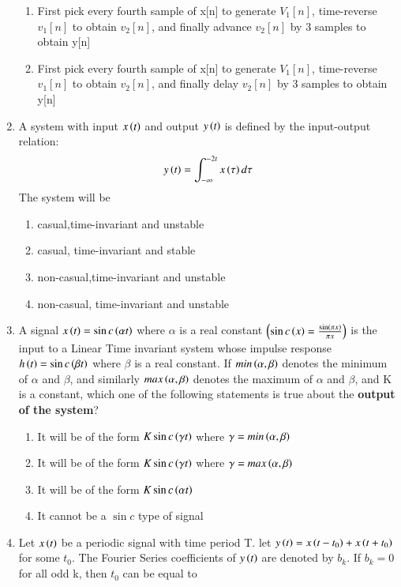 \documentclass[journal,12pt,onecolumn]{IEEEtran}
\theoremstyle{remark}
\begin{document}
\begin{enumerate}
\begin{enumerate}
          \item First pick every fourth sample of x[n] to generate $V_1[n]$, time-reverse $v_1[n]$ to obtain $v_2[n]$, and finally advance $v_2[n]$ by 3 samples to obtain y[n]
          \item  First pick every fourth sample of x[n] to generate $V_1[n]$, time-reverse $v_1[n]$ to obtain $v_2[n]$, and finally delay $v_2[n]$ by 3 samples to obtain y[n]
      \end{enumerate}
      \item A system with input $x\left(t\right)$ and output $y\left(t\right)$ is defined by the input-output relation:
      \begin{align}
          y\left(t\right)=\int_{-\infty}^{-2t}x\left(\tau\right)d\tau
      \end{align}
      The system will be 
      \begin{enumerate}
          \item casual,time-invariant and unstable
          \item casual, time-invariant and stable
          \item non-casual,time-invariant and unstable
          \item non-casual, time-invariant and unstable
      \end{enumerate}
      \item A signal $x\left(t\right)=\sin c\left(\alpha t\right)$ where $\alpha$ is a real constant $\left(\sin c\left(x\right)=\frac{\sin\left(\pi x\right)}{\pi x}\right)$ is the input to a Linear Time invariant system whose impulse response $h\left(t\right)=\sin c\left(\beta t\right)$ where $\beta$ is a real constant. If $min\left(\alpha,\beta\right)$ denotes the minimum of $\alpha$ and $\beta$, and similarly $max\left(\alpha,\beta\right)$ denotes the maximum of $\alpha$ and $\beta$, and K is a constant, which one of the following statements is true about the \textbf{output of the system}?
      \begin{enumerate}
          \item It will be of the form $K\sin c\left(\gamma t\right)$ where $\gamma=min\left(\alpha,\beta\right)$
           \item It will be of the form $K\sin c\left(\gamma t\right)$ where $\gamma=max\left(\alpha,\beta\right)$
           \item It will be of the form $K \sin c\left(\alpha t\right)$
           \item It cannot be a $\sin c$ type of signal
      \end{enumerate}
      \item Let $x\left(t\right)$ be  a periodic signal with time period T. let $y\left(t\right)=x\left(t-t_0\right)+x\left(t+t_0\right)$ for some $t_0$. The Fourier Series coefficients of $y\left(t\right)$ are denoted by $b_k$. If $b_k=0$ for all odd k, then $t_0$ can be equal to 

\end{enumerate}
\end{document}
